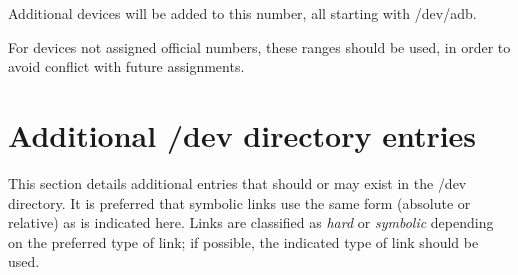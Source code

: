 \noindent
Additional devices will be added to this number, all starting with
{\file /dev/adb}.

\begin{devicelist}
	\minordots
\end{devicelist}

\begin{devicelist}
	\minordots
\end{devicelist}

\begin{devicelist}
\end{devicelist}

\begin{devicelist}
\end{devicelist}

\noindent
For devices not assigned official numbers, these ranges should be
used, in order to avoid conflict with future assignments.

\begin{devicelist}
\end{devicelist}

\begin{devicelist}
\end{devicelist}

\begin{devicelist}
\end{devicelist}

\begin{devicelist}
\end{devicelist}

\begin{devicelist}
\end{devicelist}

\section{Additional /dev directory entries}

This section details additional entries that should or may exist in the
{\file /dev} directory.  It is preferred that symbolic links use the
same form (absolute or relative) as is indicated here.  Links are
classified as {\em hard\/} or {\em symbolic\/} depending on the
preferred type of link; if possible, the indicated type of link should
be used.

